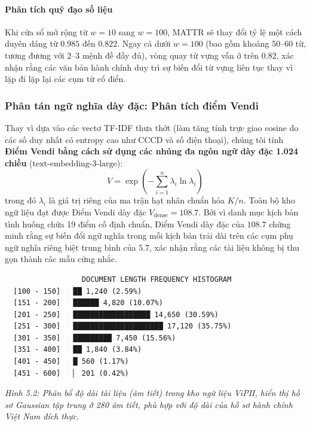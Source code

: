 \documentclass[
  11pt,
  a4paper,
]{article}
\begin{document}
\paragraph{Phân tích quỹ đạo số
liệu}\label{phuxe2n-tuxedch-quux1ef9-ux111ux1ea1o-sux1ed1-liux1ec7u}

Khi cửa sổ mở rộng từ \(w=10\) sang \(w=100\), MATTR sẽ thay đổi tỷ lệ
một cách duyên dáng từ \(0.985\) đến \(0.822\). Ngay cả dưới \(w=100\)
(bao gồm khoảng 50--60 từ, tương đương với 2--3 mệnh đề đầy đủ), vòng
quay từ vựng vẫn ở trên \(0.82\), xác nhận rằng các văn bản hành chính
duy trì sự biến đổi từ vựng liên tục thay vì lặp đi lặp lại các cụm từ
cổ điển.

\subsubsection{Phân tán ngữ nghĩa dày đặc: Phân tích điểm
Vendi}\label{phuxe2n-tuxe1n-ngux1eef-nghux129a-duxe0y-ux111ux1eb7c-phuxe2n-tuxedch-ux111iux1ec3m-vendi}

Thay vì dựa vào các vectơ TF-IDF thưa thớt (làm tăng tính trực giao
cosine do các số duy nhất có entropy cao như CCCD và số điện thoại),
chúng tôi tính \textbf{Điểm Vendi bằng cách sử dụng các nhúng đa ngôn
ngữ dày đặc 1.024 chiều} (\(\text{text-embedding-3-large}\)):
\[V = \exp\left(-\sum_{i=1}^n \lambda_i \ln \lambda_i\right)\] trong đó
\(\lambda_i\) là giá trị riêng của ma trận hạt nhân chuẩn hóa \(K/n\).
Toàn bộ kho ngữ liệu đạt được Điểm Vendi dày đặc
\textbf{\(V_{\text{dense}} = 108.7\)}. Bởi vì danh mục kịch bản tình
huống chứa 19 điểm cố định chuẩn, Điểm Vendi dày đặc của \(108.7\) chứng
minh rằng sự biến đổi ngữ nghĩa trong mỗi kịch bản trải dài trên các cụm
phụ ngữ nghĩa riêng biệt trung bình của \(5.7\), xác nhận rằng các tài
liệu không bị thu gọn thành các mẫu cứng nhắc.

\begin{verbatim}
                  DOCUMENT LENGTH FREQUENCY HISTOGRAM
  [100 - 150]   ██ 1,240 (2.59%)
  [151 - 200]   ██████ 4,820 (10.07%)
  [201 - 250]   ██████████████████ 14,650 (30.59%)
  [251 - 300]   █████████████████████ 17,120 (35.75%)
  [301 - 350]   █████████ 7,450 (15.56%)
  [351 - 400]   ██ 1,840 (3.84%)
  [401 - 450]   █ 560 (1.17%)
  [451 - 600]   ▏ 201 (0.42%)
\end{verbatim}

\emph{Hình 5.2: Phân bổ độ dài tài liệu (âm tiết) trong kho ngữ liệu
ViPII, hiển thị hồ sơ Gaussian tập trung ở 280 âm tiết, phù hợp với độ
dài của hồ sơ hành chính Việt Nam đích thực.}
\end{document}
